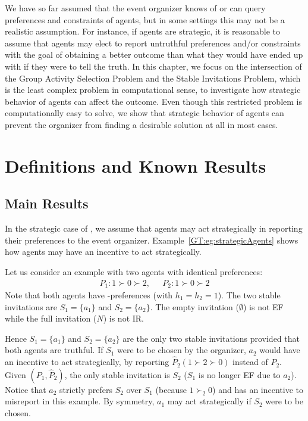 \label{GT:chapter}


We have so far assumed that the event organizer knows of or can query preferences and constraints of agents, but in some settings this may not be a realistic assumption. For instance, if agents are strategic, it is reasonable to assume that agents may elect to report untruthful preferences and/or constraints with the goal of obtaining a better outcome than what they would have ended up with if they were to tell the truth. 
In this chapter, we focus on the intersection of the Group Activity Selection Problem and the Stable Invitations Problem, which is the least complex problem in computational sense, to investigate how strategic behavior of agents can affect the outcome. Even though this restricted problem is computationally easy to solve, we show that strategic behavior of agents can prevent the organizer from finding a desirable solution at all in most cases.





\section{Definitions and Known Results} \label{GT:sec:prelim}


\subsection{Main Results}\label{GT:sec:Mechanism}
In the strategic case of \ASIP, we assume that agents may act strategically in reporting their preferences to the event organizer. 
Example~\ref{GT:eg:strategicAgents} shows how agents may have an incentive to act strategically. 


\begin{example} \label{GT:eg:strategicAgents}
	
	Let us consider an example with two agents with identical preferences:
	\begin{equation*}
		\begin{aligned}
				P_1: 1 \succ 0 \succ 2,~~~& P_2: 1 \succ 0 \succ 2
		\end{aligned}
	\end{equation*}
	Note that both agents have \DEC-preferences (with $h_1 = h_2 = 1$).
	The two stable invitations are $S_1 = \{a_1\}$ and $S_2 = \{a_2\}$. 
	The empty invitation ($\emptyset$) is not EF while the full invitation ($N$) is not IR. 

	Hence $S_1 = \{a_1\}$ and $S_2 =\{a_2\}$ are the only two stable invitations provided that both agents are truthful. 
	If $S_1$ were to be chosen by the organizer, $a_2$ would have an incentive to act strategically, by reporting $\hat{P}_2 (1 \succ 2 \succ 0)$ instead of $P_2$. 
	Given $(P_1, \hat{P}_2)$, the only stable invitation is $S_2$ ($S_1$ is no longer EF due to $a_2$).
	Notice that $a_2$ strictly prefers $S_2$ over $S_1$ (because $1 \succ_2 0$) and has an incentive to misreport in this example. By symmetry, $a_1$ may act strategically if $S_2$ were to be chosen. 
\end{example}


